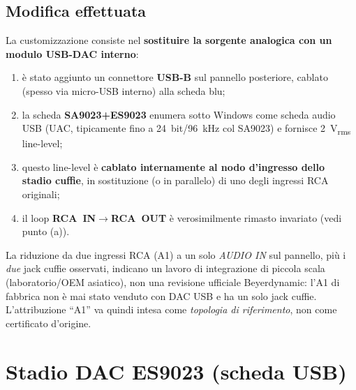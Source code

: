 \subsection{Modifica effettuata}
La customizzazione consiste nel \textbf{sostituire la sorgente analogica
con un modulo USB-DAC interno}:
\begin{enumerate}
  \item è stato aggiunto un connettore \textbf{USB-B} sul pannello
        posteriore, cablato (spesso via micro-USB interno) alla scheda blu;
  \item la scheda \textbf{SA9023+ES9023} enumera sotto Windows come
        scheda audio USB (UAC, tipicamente fino a \SI{24}{bit}/\SI{96}{kHz}
        col SA9023) e fornisce \SI{2}{V_{rms}} line-level;
  \item questo line-level è \textbf{cablato internamente al nodo
        d'ingresso dello stadio cuffie}, in sostituzione (o in parallelo)
        di uno degli ingressi RCA originali;
  \item il loop \textbf{RCA~IN$\rightarrow$RCA~OUT} è verosimilmente
        rimasto invariato (vedi punto (a)).
\end{enumerate}
La riduzione da due ingressi RCA (A1) a un solo \emph{AUDIO IN} sul
pannello, più i \emph{due} jack cuffie osservati, indicano un lavoro di
integrazione di piccola scala (laboratorio/OEM asiatico), non una
revisione ufficiale Beyerdynamic: l'A1 di fabbrica non è mai stato
venduto con DAC USB e ha un solo jack cuffie. L'attribuzione ``A1'' va
quindi intesa come \emph{topologia di riferimento}, non come certificato
d'origine.

\section{Stadio DAC ES9023 (scheda USB)}

